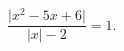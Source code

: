 \begin{ex}[type=equation]
	\begin{condition}
		$\dfrac{\big | x^2 -5x + 6\big|}{\big|x\big| - 2} = 1.$
	\end{condition}
\end{ex}